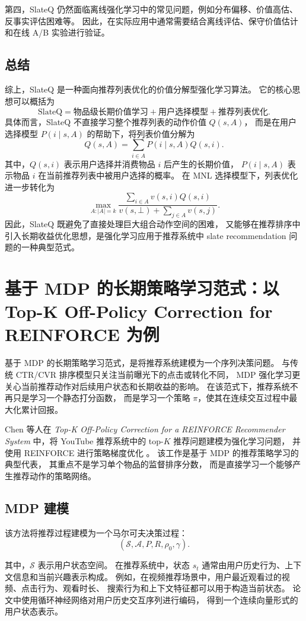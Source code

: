\documentclass[11pt]{ctexart}
\begin{document}
第四，SlateQ 仍然面临离线强化学习中的常见问题，例如分布偏移、价值高估、反事实评估困难等。
因此，在实际应用中通常需要结合离线评估、保守价值估计和在线 A/B 实验进行验证。

\subsection{总结}

综上，SlateQ 是一种面向推荐列表优化的价值分解型强化学习算法。
它的核心思想可以概括为
\[
\text{SlateQ}
=
\text{物品级长期价值学习}
+
\text{用户选择模型}
+
\text{推荐列表优化}.
\]
具体而言，SlateQ 不直接学习整个推荐列表的动作价值 $Q(s,A)$，
而是在用户选择模型 $P(i\mid s,A)$ 的帮助下，将列表价值分解为
\[
Q(s,A)
=
\sum_{i\in A}P(i\mid s,A)Q(s,i).
\]
其中，$Q(s,i)$ 表示用户选择并消费物品 $i$ 后产生的长期价值，
$P(i\mid s,A)$ 表示物品 $i$ 在当前推荐列表中被用户选择的概率。
在 MNL 选择模型下，列表优化进一步转化为
\[
\max_{A:|A|=k}
\frac{
\sum_{i\in A}v(s,i)Q(s,i)
}{
v(s,\bot)+\sum_{j\in A}v(s,j)
}.
\]
因此，SlateQ 既避免了直接处理巨大组合动作空间的困难，
又能够在推荐排序中引入长期收益优化思想，是强化学习应用于推荐系统中 slate recommendation
问题的一种典型范式。

\section{基于 MDP 的长期策略学习范式：以 Top-K Off-Policy Correction for REINFORCE 为例}

基于 MDP 的长期策略学习范式，是将推荐系统建模为一个序列决策问题。
与传统 CTR/CVR 排序模型只关注当前曝光下的点击或转化不同，
MDP 强化学习更关心当前推荐动作对后续用户状态和长期收益的影响。
在该范式下，推荐系统不再只是学习一个静态打分函数，
而是学习一个策略 $\pi$，使其在连续交互过程中最大化累计回报。

Chen 等人在 \textit{Top-K Off-Policy Correction for a REINFORCE Recommender System}
中，将 YouTube 推荐系统中的 top-$K$ 推荐问题建模为强化学习问题，
并使用 REINFORCE 进行策略梯度优化 \cite{chen2019topk}。
该工作是基于 MDP 的推荐策略学习的典型代表，
其重点不是学习单个物品的监督排序分数，
而是直接学习一个能够产生推荐动作的策略网络。

\subsection{MDP 建模}

该方法将推荐过程建模为一个马尔可夫决策过程：
\[
(\mathcal{S},\mathcal{A},P,R,\rho_0,\gamma).
\]

其中，$\mathcal{S}$ 表示用户状态空间。
在推荐系统中，状态 $s_t$ 通常由用户历史行为、上下文信息和当前兴趣表示构成。
例如，在视频推荐场景中，用户最近观看过的视频、点击行为、观看时长、
搜索行为和上下文特征都可以用于构造当前状态。
论文中使用循环神经网络对用户历史交互序列进行编码，
得到一个连续向量形式的用户状态表示。
\end{document}
